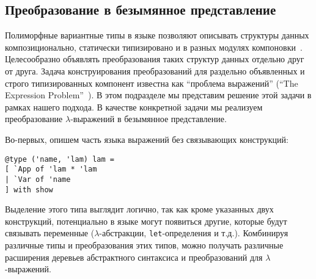 %
%
%

\subsection{Преобразование в безымянное представление}
\label{sec:nameless}

Полиморфные вариантные типы в языке \ocaml{} позволяют описывать структуры данных композиционально, статически типизировано и в разных модулях компоновки~\cite{PolyVarReuse}.
Целесообразно объявлять преобразования таких структур данных отдельно друг от друга. Задача конструирования преобразований для 
раздельно объявленных и строго типизированных компонент известна как ``проблема выражений'' (``The Expression Problem''~\cite{ExpressionProblem}).
В этом подразделе мы представим решение этой задачи в рамках нашего подхода. В качестве конкретной задачи мы реализуем преобразование $\lambda$-выражений в безымянное представление.

Во-первых, опишем часть языка выражений без связывающих конструкций:

\begin{lstlisting}
@type ('name, 'lam) lam = 
[ `App of 'lam * 'lam
| `Var of 'name
] with show
\end{lstlisting}

\noindent Выделение этого типа выглядит логично, так как 
кроме указанных двух конструкций, потенциально в языке могут появиться другие, которые будут связывать переменные 
($\lambda$-абстракции, \lstinline{let}-определения и т.д.). Комбинируя различные типы и преобразования этих типов, можно получать различные расширения деревьев абстрактного синтаксиса и преобразований для $\lambda$-выражений.

